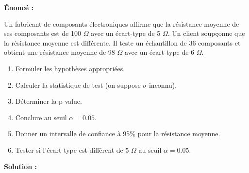 \documentclass[11pt,a4paper]{article}
\begin{document}
\textbf{Énoncé :}

Un fabricant de composants électroniques affirme que la résistance moyenne de ses composants est de 100 $\Omega$ avec un écart-type de 5 $\Omega$. Un client soupçonne que la résistance moyenne est différente. Il teste un échantillon de 36 composants et obtient une résistance moyenne de 98 $\Omega$ avec un écart-type de 6 $\Omega$.

\begin{enumerate}
    \item Formuler les hypothèses appropriées.
    \item Calculer la statistique de test (on suppose $\sigma$ inconnu).
    \item Déterminer la p-value.
    \item Conclure au seuil $\alpha = 0.05$.
    \item Donner un intervalle de confiance à 95\% pour la résistance moyenne.
    \item Tester si l'écart-type est différent de 5 $\Omega$ au seuil $\alpha = 0.05$.
\end{enumerate}

\textbf{Solution :}
\end{document}
